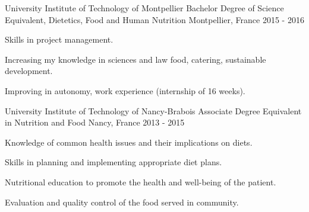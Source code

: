 
\vspace{0.5cm}

\begin{cventries}
  \cventry
    {University Institute of Technology of Montpellier}
    {Bachelor Degree of Science Equivalent, Dietetics, Food and Human Nutrition}
    {Montpellier, France}
    {2015 - 2016}
    {
      \begin{cvitems}
        \item {Skills in project management.}
        \item {Increasing my knowledge in sciences and law food, catering, sustainable development.}
        \item {Improving in autonomy, work experience (internship of 16 weeks).}
      \end{cvitems}
    }
    {}
  \cventry
    {University Institute of Technology of Nancy-Brabois}
    {Associate Degree Equivalent in Nutrition and Food}
    {Nancy, France}
    {2013 - 2015}
    {
      \begin{cvitems}
        \item {Knowledge of common health issues and their implications on diets.}
        \item {Skills in planning and implementing appropriate diet plans.}
        \item {Nutritional education to promote the health and well-being of the patient.}
        \item {Evaluation and quality control of the food served in community.}
      \end{cvitems}
    }
    {}
\end{cventries}
